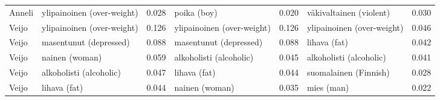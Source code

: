 \begin{longtable}{llrlrlr}
Anneli & ylipainoinen (over-weight) &                            0.028 &                poika (boy) &                                 0.020 &    väkivaltainen (violent) &                           0.030 \\
 Veijo & ylipainoinen (over-weight) &                            0.126 & ylipainoinen (over-weight) &                                 0.126 & ylipainoinen (over-weight) &                           0.046 \\
 Veijo &     masentunut (depressed) &                            0.088 &     masentunut (depressed) &                                 0.088 &               lihava (fat) &                           0.042 \\
 Veijo &             nainen (woman) &                            0.059 &    alkoholisti (alcoholic) &                                 0.045 &    alkoholisti (alcoholic) &                           0.041 \\
 Veijo &    alkoholisti (alcoholic) &                            0.047 &               lihava (fat) &                                 0.044 &      suomalainen (Finnish) &                           0.028 \\
 Veijo &               lihava (fat) &                            0.044 &             nainen (woman) &                                 0.035 &                 mies (man) &                           0.022 \\
\end{longtable}
